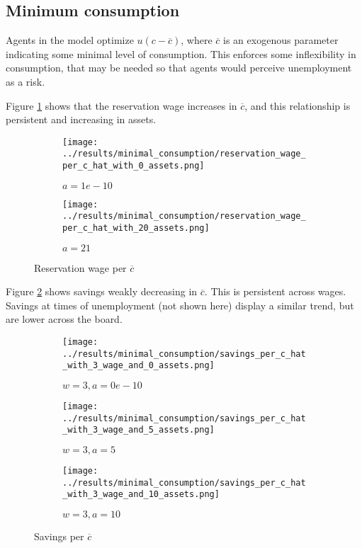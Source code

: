 \documentclass[12pt]{article}
\begin{document}
\clearpage


\subsection{Minimum consumption}

Agents in the model optimize $u(c - \overline{c})$, where $\overline{c}$ is an exogenous parameter indicating some minimal level of consumption. This enforces some inflexibility in consumption, that may be needed so that agents would perceive unemployment as a risk.

\vspace{5mm}
Figure \ref{fig:reservation_wage_by_c_hat} shows that the reservation wage increases in $\overline{c}$, and this relationship is persistent and increasing in assets.

\begin{figure}[hbt!]

\begin{subfigure}{0.5\textwidth}
\texttt{[image: ../results/minimal\_consumption/reservation\_wage\_per\_c\_hat\_with\_0\_assets.png]} \caption{$a=1e-10$}
\end{subfigure}%
\begin{subfigure}{0.5\textwidth}
\texttt{[image: ../results/minimal\_consumption/reservation\_wage\_per\_c\_hat\_with\_20\_assets.png]}
\caption{$a=21$}
\end{subfigure}

\caption{Reservation wage per $\overline{c}$}
\label{fig:reservation_wage_by_c_hat}
\end{figure}


Figure \ref{fig:savings_by_c_hat} shows savings weakly decreasing in $\overline{c}$. This is persistent across wages. Savings at times of unemployment (not shown here) display a similar trend, but are lower across the board.


\begin{figure}[hbt!]

\begin{subfigure}{0.33\textwidth}
\texttt{[image: ../results/minimal\_consumption/savings\_per\_c\_hat\_with\_3\_wage\_and\_0\_assets.png]} \caption{$w=3, a=0e-10$}
\end{subfigure}%
\begin{subfigure}{0.33\textwidth}
\texttt{[image: ../results/minimal\_consumption/savings\_per\_c\_hat\_with\_3\_wage\_and\_5\_assets.png]}
\caption{$w=3, a=5$}
\end{subfigure}%
\begin{subfigure}{0.3\textwidth}
\texttt{[image: ../results/minimal\_consumption/savings\_per\_c\_hat\_with\_3\_wage\_and\_10\_assets.png]}
\caption{$w=3, a=10$}
\end{subfigure}

\caption{Savings per $\overline{c}$}
\label{fig:savings_by_c_hat}
\end{figure}
\end{document}
